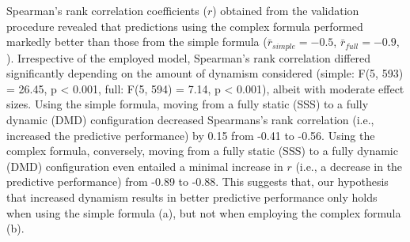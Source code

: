 \documentclass[../FinalThesis.tex]{subfiles}
\begin{document}
Spearman's rank correlation coefficients ($r$) obtained from the validation
procedure revealed that predictions using the complex formula performed markedly
better than those from the simple formula ($\bar{r}_{simple} = -0.5$,
$\bar{r}_{full} = -0.9$, ). Irrespective of the employed
model, Spearman's rank correlation differed significantly depending on the
amount of dynamism considered (simple: F(5, 593) = 26.45, p < 0.001, full: F(5,
594) = 7.14, p < 0.001), albeit with moderate effect sizes. Using the simple
formula, moving from a fully static (SSS) to a fully dynamic (DMD) configuration
decreased Spearmans's rank correlation (i.e., increased the predictive
performance) by 0.15 from -0.41 to -0.56. Using the complex formula, conversely,
moving from a fully static (SSS) to a fully dynamic (DMD) configuration even
entailed a minimal increase in $r$ (i.e., a decrease in the predictive
performance) from -0.89 to -0.88. This suggests that, our hypothesis that
increased dynamism results in better predictive performance only holds when
using the simple formula (a), but not when employing the
complex formula (b).
\end{document}
